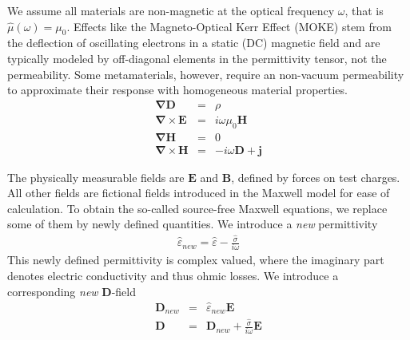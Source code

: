 \documentclass[12pt,a4paper,twoside,openright,BCOR10mm,headsepline,titlepage,abstracton,chapterprefix,final]{scrreprt}
\newcommand\Vector[1]{{\mathbf{#1}}}
\newcommand\vacuum{0}
\newcommand\Nabla{\Vector{\nabla}}
\newcommand\Tensor[1]{\hat{#1}}
\newcommand\scalarEfield{E}
\newcommand\scalarBfield{B}
\newcommand\scalarHfield{H}
\newcommand\scalarDfield{D}
\newcommand\Efield{\Vector{\scalarEfield}}
\newcommand\Bfield{\Vector{\scalarBfield}}
\newcommand\Hfield{\Vector{\scalarHfield}}
\newcommand\Dfield{\Vector{\scalarDfield}}
\newcommand\permeability{\Tensor{\scalarpermeability}}
\newcommand\vacuumpermeability{\scalarpermeability_{\vacuum}}
\newcommand\scalarpermeability{\mu}
\newcommand\permittivity{\Tensor{\scalarpermittivity}}
\newcommand\scalarpermittivity{\varepsilon}
\newcommand\conductivity{\Tensor{\sigma}}
\newcommand\currentdensity{\Vector{j}}
\newcommand\chargedensity{\rho}
\begin{document}
We assume all materials are non-magnetic at the optical frequency $\omega$, that is $\permeability(\omega) = \vacuumpermeability$. 
Effects like the Magneto-Optical Kerr Effect (MOKE) stem from the deflection of oscillating electrons in a static (DC) magnetic field and are typically modeled by off-diagonal elements in the permittivity tensor, not the permeability.
Some metamaterials, however, require an non-vacuum permeability to approximate their response with homogeneous material properties. 
\begin{subequations}
\begin{eqnarray}
  \Nabla \Dfield &=& \chargedensity 					\\
  \Nabla \times \Efield &=& i \omega \vacuumpermeability \Hfield	\\
  \Nabla \Hfield &=& 0  					\\
  \Nabla \times \Hfield &=& - i \omega \Dfield + \currentdensity  		
\end{eqnarray}
\end{subequations}

The physically measurable fields are $\Efield$ and $\Bfield$, defined by forces on test charges. All other fields are fictional fields introduced in the Maxwell model for ease of calculation.
To obtain the so-called source-free Maxwell equations, we replace some of them by newly defined quantities.
We introduce a \emph{new} permittivity
\begin{eqnarray}
  \permittivity_{new} = \permittivity - \frac{\conductivity}{i \omega}
\end{eqnarray}
This newly defined permittivity is complex valued, where the imaginary part denotes electric conductivity and thus ohmic losses.
We introduce a corresponding \emph{new} $\Dfield$-field
\begin{eqnarray}
  \Dfield_{new} &=& \permittivity_{new} \Efield \\
  \Dfield &=& \Dfield_{new} + \frac{\conductivity}{i \omega} \Efield
\end{eqnarray}
\end{document}
